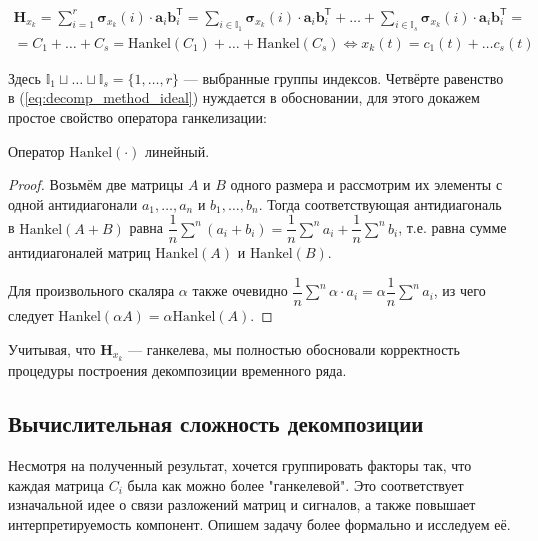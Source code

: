 	    	\begin{multline}\label{eq:decomp_method_ideal}
	    		\mathbf{H}_{x_k} = \sum\limits_{i = 1}^{r} \boldsymbol{\sigma}_{x_k}(i) \cdot \mathbf{a}_i  \mathbf{b}_i^{\mathsf{T}} = \sum\limits_{i \in \mathbb{I}_1} \boldsymbol{\sigma}_{x_k}(i) \cdot \mathbf{a}_i  \mathbf{b}_i^{\mathsf{T}} + \ldots + \sum\limits_{i \in \mathbb{I}_s} \boldsymbol{\sigma}_{x_k}(i) \cdot \mathbf{a}_i  \mathbf{b}_i^{\mathsf{T}} = \\ = C_1 + \ldots + C_s = \text{Hankel}(C_1) + \ldots + \text{Hankel}(C_s)  \Leftrightarrow x_k(t) = c_1(t) + \ldots c_s(t)
	    	\end{multline}
	    	
	    	Здесь $ \mathbb{I}_1 \sqcup \ldots \sqcup \mathbb{I}_s = \{1, \ldots, r\} $ --- выбранные группы индексов. Четвёрте равенство в (\ref{eq:decomp_method_ideal}) нуждается в обосновании, для этого докажем простое свойство оператора ганкелизации:
	    	
	    	\begin{Lem}
	    		Оператор $ \text{Hankel}(\cdot) $ линейный.
	    	\end{Lem}
	    	
	    	\begin{proof}
	    		Возьмём две матрицы $ A $ и $ B $ одного размера и рассмотрим их элементы с одной антидиагонали $ a_1, \ldots, a_n $ и $ b_1, \ldots, b_n $. Тогда соответствующая антидиагональ в $ \text{Hankel}(A + B) $ равна $ \dfrac{1}{n} \sum\limits^n (a_i + b_i) = \dfrac{1}{n} \sum\limits^n a_i + \dfrac{1}{n} \sum\limits^n b_i $, т.е. равна сумме антидиагоналей матриц $ \text{Hankel}(A) $ и $ \text{Hankel}(B) $.
	    		
	    		Для произвольного скаляра $ \alpha $ также очевидно $ \dfrac{1}{n} \sum\limits^n \alpha \cdot a_i = \alpha \dfrac{1}{n} \sum\limits^n a_i $, из чего следует $ \text{Hankel}(\alpha A) = \alpha \text{Hankel}(A) $.
	    	\end{proof}
	    	
	    	Учитывая, что $ \mathbf{H}_{x_k} $ --- ганкелева, мы полностью обосновали корректность процедуры построения декомпозиции временного ряда.
	    	
	    \subsection*{Вычислительная сложность декомпозиции}
	    	
	    	Несмотря на полученный результат, хочется группировать факторы так, что каждая матрица $ C_i $ была как можно более "ганкелевой". Это соответствует изначальной идее о связи разложений матриц и сигналов, а также повышает интерпретируемость компонент. Опишем задачу более формально и исследуем её.
	    	
